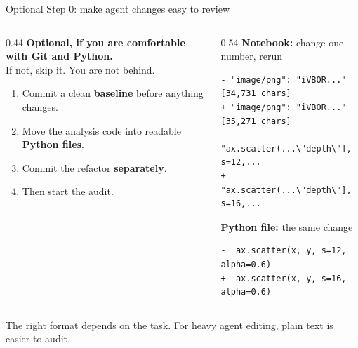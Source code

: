 \begin{frame}[fragile]{Optional Step 0: make agent changes easy to review}
  \vfill
  \begin{columns}[c]
    \begin{column}{0.44\textwidth}
      {\small\textbf{Optional, if you are comfortable with Git and Python.}\\
      If not, skip it. You are not behind.}\\[0.8em]
      \begin{enumerate}\small\setlength\itemsep{0.35em}
        \item Commit a clean \textbf{baseline} before anything changes.
        \item Move the analysis code into readable \textbf{Python files}.
        \item Commit the refactor \textbf{separately}.
        \item Then start the audit.
      \end{enumerate}
    \end{column}
    \begin{column}{0.54\textwidth}
      {\footnotesize\textbf{Notebook:} change one number, rerun}
      \begin{lstlisting}[basicstyle=\ttfamily\scriptsize, aboveskip=0.1em, belowskip=0.2em]
- "image/png": "iVBOR..." [34,731 chars]
+ "image/png": "iVBOR..." [35,271 chars]
- "ax.scatter(...\"depth\"], s=12,...
+ "ax.scatter(...\"depth\"], s=16,...
      \end{lstlisting}
      {\footnotesize\textbf{Python file:} the same change}
      \begin{lstlisting}[basicstyle=\ttfamily\scriptsize, aboveskip=0.1em, belowskip=0.2em]
-  ax.scatter(x, y, s=12, alpha=0.6)
+  ax.scatter(x, y, s=16, alpha=0.6)
      \end{lstlisting}
    \end{column}
  \end{columns}
  \vspace{0.3em}
  \begin{center}\small
    The right format depends on the task. For heavy agent editing, plain text is easier to audit.
  \end{center}
  \vspace{0.6cm plus 1fill}
\end{frame}
